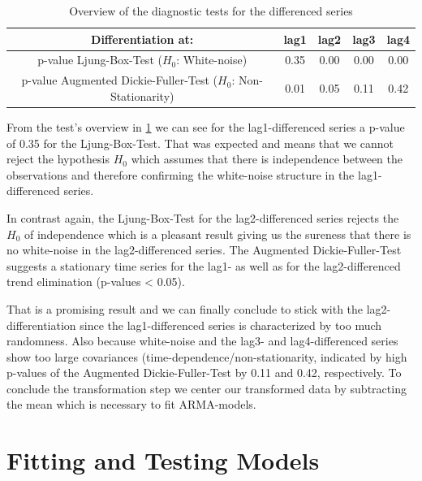\documentclass[11pt,a4paper]{article}
\begin{document}
\begin{table}
\centering
\begin{tabular}{c|cccc}
    Differentiation at:  & lag1 & lag2 & lag3 & lag4 \\
    \hline 
    \makecell{p-value Ljung-Box-Test\\($H_0$: White-noise)} & 0.35 & 0.00 & 0.00 & 0.00\\
    \makecell{p-value Augmented Dickie-Fuller-Test\\($H_0$: Non-Stationarity)} & 0.01 & 0.05 & 0.11 & 0.42\\
\end{tabular}
\caption{Overview of the diagnostic tests for the differenced series}
\label{table:overview_diffs}
\end{table}

From the test's overview in \cref{table:overview_diffs} we can see for the lag1-differenced series a p-value of 0.35 for the Ljung-Box-Test.
That was expected and means that we cannot reject the hypothesis $H_0$ which assumes that there is independence between the observations \citep{LjungBox78} and therefore confirming the white-noise structure in the lag1-differenced series.

In contrast again, the Ljung-Box-Test for the lag2-differenced series rejects the $H_0$ of independence which is a pleasant result giving us the sureness that there is no white-noise in the lag2-differenced series.
The Augmented Dickie-Fuller-Test suggests a stationary time series for the lag1- as well as for the lag2-differenced trend elimination (p-values < 0.05).

That is a promising result and we can finally conclude to stick with the lag2-differentiation since the lag1-differenced series is characterized by too much randomness.
Also because white-noise and the lag3- and lag4-differenced series show too large covariances (time-dependence/non-stationarity, indicated by high p-values of the Augmented Dickie-Fuller-Test by 0.11 and 0.42, respectively.
To conclude the transformation step we center our transformed data by subtracting the mean which is necessary to fit ARMA-models.



\section{Fitting and Testing Models}
\label{sec:FitTestModel}
\end{document}
